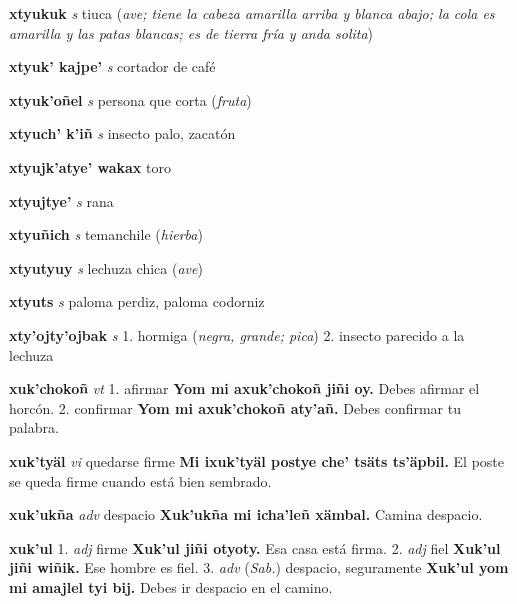 \documentclass[10pt]{scrbook}
\newcommand{\entry}[1]{\textbf{#1}}
\newcommand{\onedefinition}[1]{#1.}
\newcommand{\partofspeech}[1]{\textit{#1}}
\newcommand{\spanishtranslation}[1]{#1}
\newcommand{\clarification}[1]{(\textit{#1})}
\newcommand{\cholexample}[1]{\textbf{#1}}
\newcommand{\exampletranslation}[1]{#1}
\newcommand{\relevantdialect}[1]{(\textit{#1})}
\begin{document}
\begin{multicols}{2}
\entry{xtyukuk}
\partofspeech{s}
\spanishtranslation{tiuca}
\clarification{ave; tiene la cabeza amarilla arriba y blanca abajo; la cola es amarilla y las patas blancas; es de tierra fría y anda solita}

\entry{xtyuk' kajpe'}
\partofspeech{s}
\spanishtranslation{cortador de café}

\entry{xtyuk'oñel}
\partofspeech{s}
\spanishtranslation{persona que corta}
\clarification{fruta}

\entry{xtyuch' k'iñ}
\partofspeech{s}
\spanishtranslation{insecto palo, zacatón}

\entry{xtyujk'atye' wakax}
\spanishtranslation{toro}

\entry{xtyujtye'}
\partofspeech{s}
\spanishtranslation{rana}

\entry{xtyuñich}
\partofspeech{s}
\spanishtranslation{temanchile}
\clarification{hierba}

\entry{xtyutyuy}
\partofspeech{s}
\spanishtranslation{lechuza chica}
\clarification{ave}

\entry{xtyuts}
\partofspeech{s}
\spanishtranslation{paloma perdiz, paloma codorniz}

\entry{xty'ojty'ojbak}
\partofspeech{s}
\onedefinition{1}
\spanishtranslation{hormiga}
\clarification{negra, grande; pica}
\onedefinition{2}
\spanishtranslation{insecto parecido a la lechuza}

\entry{xuk'chokoñ}
\partofspeech{vt}
\onedefinition{1}
\spanishtranslation{afirmar}
\cholexample{Yom mi axuk'chokoñ jiñi oy.}
\exampletranslation{Debes afirmar el horcón.}
\onedefinition{2}
\spanishtranslation{confirmar}
\cholexample{Yom mi axuk'chokoñ aty'añ.}
\exampletranslation{Debes confirmar tu palabra.}

\entry{xuk'tyäl}
\partofspeech{vi}
\spanishtranslation{quedarse firme}
\cholexample{Mi ixuk'tyäl postye che' tsäts ts'äpbil.}
\exampletranslation{El poste se queda firme cuando está bien sembrado.}

\entry{xuk'ukña}
\partofspeech{adv}
\spanishtranslation{despacio}
\cholexample{Xuk'ukña mi icha'leñ xämbal.}
\exampletranslation{Camina despacio.}

\entry{xuk'ul}
\onedefinition{1}
\partofspeech{adj}
\spanishtranslation{firme}
\cholexample{Xuk'ul jiñi otyoty.}
\exampletranslation{Esa casa está firma.}
\onedefinition{2}
\partofspeech{adj}
\spanishtranslation{fiel}
\cholexample{Xuk'ul jiñi wiñik.}
\exampletranslation{Ese hombre es fiel.}
\onedefinition{3}
\partofspeech{adv}
\relevantdialect{Sab.}
\spanishtranslation{despacio, seguramente}
\cholexample{Xuk'ul yom mi amajlel tyi bij.}
\exampletranslation{Debes ir despacio en el camino.}


\end{multicols}
\end{document}
